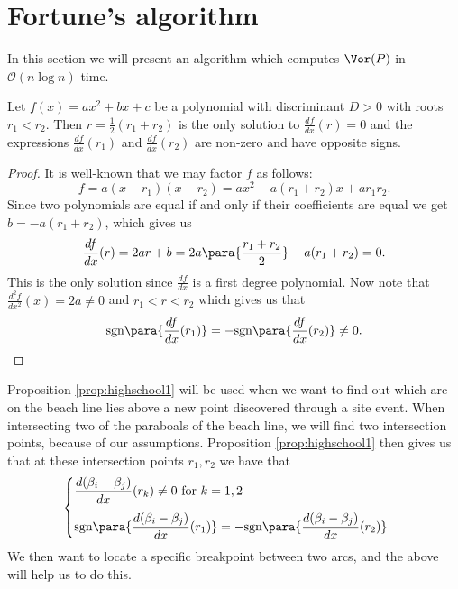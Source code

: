 \section{Fortune's algorithm}
In this section we will present an algorithm which computes $\Vor(P)$ in $\mathcal{O}(n \log n)$ time. 


\newpage
\begin{prop} \label{prop:highschool1}
Let $f(x) = a x^2 + b x + c$ be a polynomial with discriminant $D > 0$ with roots $r_1 < r_2$. Then $r = \tfrac{1}{2}(r_1 + r_2)$ is the only solution to $\displaystyle\frac{df}{dx}(r) = 0$ and the expressions $\displaystyle\frac{df}{dx}(r_1)$ and $\displaystyle\frac{df}{dx}(r_2)$ are non-zero and have opposite signs.
\end{prop}
\begin{proof}
It is well-known that we may factor $f$ as follows:
\[
    f = a (x - r_1) (x - r_2) = a x^2 - a(r_1 + r_2) x + a r_1 r_2.
\]
Since two polynomials are equal if and only if their coefficients are equal we get $b = - a (r_1 + r_2)$, which gives us
\[
    \frac{df}{dx} (r) = 2 a r + b = 2 a \para{\frac{r_1 + r_2}{2}} - a (r_1 + r_2) = 0.
\]
This is the only solution since $\displaystyle\frac{df}{dx}$ is a first degree polynomial. Now note that $\displaystyle\frac{d^2 f}{d x^2}(x) = 2a \ne 0$ and $r_1 < r < r_2$ which gives us that
\[
    \text{sgn} \para{\frac{df}{dx}(r_1)} = -\text{sgn} \para{\frac{df}{dx}(r_2)} \ne 0.
\]
\end{proof}

Proposition \ref{prop:highschool1} will be used when we want to find out which arc on the beach line lies above a new point discovered through a site event. When intersecting two of the paraboals of the beach line, we will find two intersection points, because of our assumptions. Proposition \ref{prop:highschool1} then gives us that at these intersection points $r_1, r_2$ we have that
\[
    \begin{cases}
        \displaystyle\frac{d(\beta_i - \beta_j)}{dx}(r_k) \ne 0 \text{ for } k = 1, 2 & \text{ }\vspace{0.25cm} \\ \text{sgn} \para{\displaystyle\frac{d(\beta_i - \beta_j)}{dx}(r_1)} = -\text{sgn} \para{\displaystyle\frac{d(\beta_i - \beta_j)}{dx}(r_2)} & \text{ }
    \end{cases}
\]
We then want to locate a specific breakpoint between two arcs, and the above will help us to do this.

